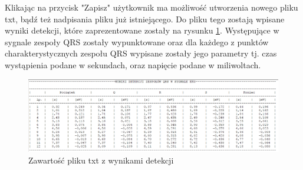 \documentclass[11pt]{report}
\begin{document}
	Klikając na przycisk "Zapisz" użytkownik ma możliwość utworzenia nowego pliku txt, bądź też nadpisania pliku już istniejącego. Do pliku tego zostają wpisane wyniki detekcji, które zaprezentowane zostały na rysunku \ref{fig:wynik}. Występujące w sygnale zespoły QRS zostały wypunktowane oraz dla każdego z punktów charakterystycznych zespołu QRS wypisane zostały jego parametry tj. czas wystąpienia podane w sekundach, oraz napięcie podane w miliwoltach.
	
	\begin{figure} [H]
		\centering
		\includegraphics[width=1\linewidth]{wynik.png}
		\caption{Zawartość pliku txt z wynikami detekcji}
		\label{fig:wynik}
	\end{figure}
	\vspace{2cm}
	
	
\end{document}
